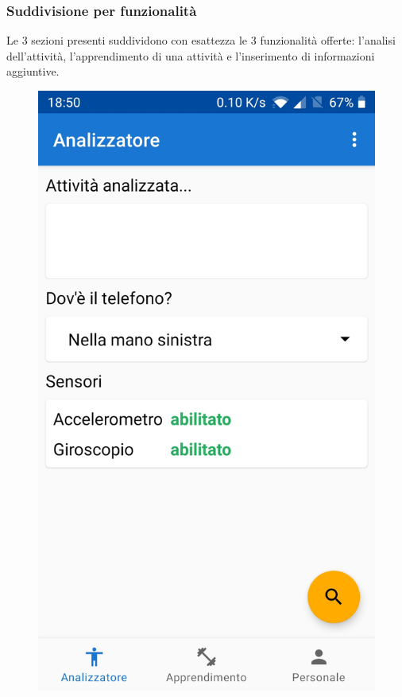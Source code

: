 \subsubsection{Suddivisione per funzionalità}
Le 3 sezioni presenti suddividono con esattezza le 3 funzionalità offerte: 
l'analisi dell'attività, l'apprendimento di una attività e l'inserimento di informazioni aggiuntive.
\begin{figure}[H]
    \centering
    \includegraphics[scale = 0.1019]{assets/images/screenshots/1a_Init.jpg}

\end{figure}
